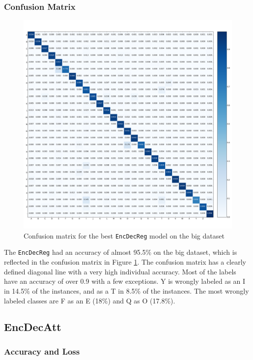 \subsubsection{Confusion Matrix}
\begin{figure}[H]
    \centering
    \includegraphics[width=1\textwidth]{fig/results/experiment1/big/encdecreg/confusion_matrix.png}
    \caption{Confusion matrix for the best {\tt EncDecReg} model on the big dataset}
    \label{fig:result1_big_encdecreg_confusion_matrix}
\end{figure}

The {\tt EncDecReg} had an accuracy of almost 95.5\% on the big dataset, which is reflected in the confusion matrix in Figure \ref{fig:result1_big_encdecreg_confusion_matrix}. The confusion matrix has a clearly defined diagonal line with a very high individual accuracy. Most of the labels have an accuracy of over 0.9 with a few exceptions. Y is wrongly labeled as an I in 14.5\% of the instances, and as a T in 8.5\% of the instances. The most wrongly labeled classes are F as an E (18\%) and Q as O (17.8\%).

\newpage
\subsection{EncDecAtt}
\subsubsection{Accuracy and Loss}
\newpage
{}

